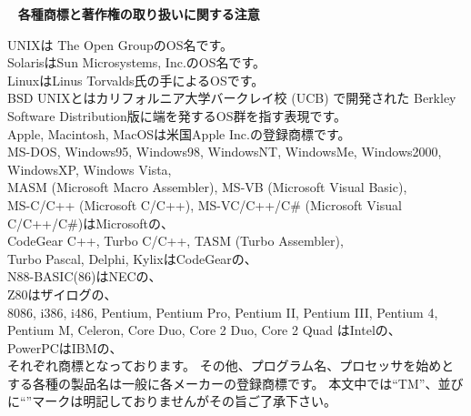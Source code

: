 ﻿%
%
%
%
%

~ \vfill %
\noindent
\textbf{各種商標と著作権の取り扱いに関する注意}
\medskip

{\small
\noindent
UNIXは The Open GroupのOS名です。				\\
SolarisはSun Microsystems, Inc.のOS名です。				\\
LinuxはLinus Torvalds氏の手によるOSです。				\\
BSD UNIXとはカリフォルニア大学バークレイ校 (UCB) で開発された
Berkley Software Distribution版に端を発するOS群を指す表現です。				\\
Apple, Macintosh, MacOSは米国Apple Inc.の登録商標です。				\\
MS-DOS, Windows95, Windows98, WindowsNT, WindowsMe, Windows2000, WindowsXP, Windows Vista,	\\
MASM (Microsoft Macro Assembler), MS-VB (Microsoft Visual Basic),				\\
MS-C/C++ (Microsoft C/C++), MS-VC/C++/C\# (Microsoft Visual C/C++/C\#)はMicrosoftの、				\\
CodeGear C++, Turbo C/C++, TASM (Turbo Assembler),				\\
Turbo Pascal, Delphi, KylixはCodeGearの、				\\
N88-BASIC(86)はNECの、				\\
Z80はザイログの、				\\
8086, i386, i486, Pentium, Pentium Pro, Pentium II, Pentium III, Pentium 4, Pentium M,
Celeron, Core Duo, Core 2 Duo, Core 2 Quad はIntelの、				\\
PowerPCはIBMの、				\\
それぞれ商標となっております。
その他、プログラム名、プロセッサを始めとする各種の製品名は一般に各メーカーの登録商標です。
本文中では``TM''、並びに``\textregistered''マークは明記しておりませんがその旨ご了承下さい。

}
